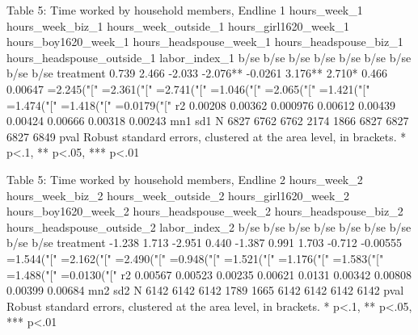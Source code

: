 
Table 5: Time worked by household members, Endline 1
	hours_week_1	hours_week_biz_1	hours_week_outside_1	hours_girl1620_week_1	hours_boy1620_week_1	hours_headspouse_week_1	hours_headspouse_biz_1	hours_headspouse_outside_1	labor_index_1
	b/se	b/se	b/se	b/se	b/se	b/se	b/se	b/se	b/se
treatment	0.739	2.466	-2.033	-2.076**	-0.0261	3.176**	2.710*	0.466	0.00647
	=2.245("["	=2.361("["	=2.741("["	=1.046("["	=2.065("["	=1.421("["	=1.474("["	=1.418("["	=0.0179("["
r2	0.00208	0.00362	0.000976	0.00612	0.00439	0.00424	0.00666	0.00318	0.00243
mn1									
sd1									
N	6827	6762	6762	2174	1866	6827	6827	6827	6849
pval									
Robust standard errors, clustered at the area level, in brackets.
* p<.1, ** p<.05, *** p<.01

Table 5: Time worked by household members, Endline 2
	hours_week_2	hours_week_biz_2	hours_week_outside_2	hours_girl1620_week_2	hours_boy1620_week_2	hours_headspouse_week_2	hours_headspouse_biz_2	hours_headspouse_outside_2	labor_index_2
	b/se	b/se	b/se	b/se	b/se	b/se	b/se	b/se	b/se
treatment	-1.238	1.713	-2.951	0.440	-1.387	0.991	1.703	-0.712	-0.00555
	=1.544("["	=2.162("["	=2.490("["	=0.948("["	=1.521("["	=1.176("["	=1.583("["	=1.488("["	=0.0130("["
r2	0.00567	0.00523	0.00235	0.00621	0.0131	0.00342	0.00808	0.00399	0.00684
mn2									
sd2									
N	6142	6142	6142	1789	1665	6142	6142	6142	6142
pval									
Robust standard errors, clustered at the area level, in brackets.
* p<.1, ** p<.05, *** p<.01
